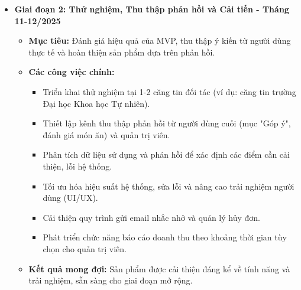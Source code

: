 \documentclass[12pt,a4paper]{article}
\begin{document}
\begin{itemize}[label=\textbullet]
    \item \textbf{Giai đoạn 2: Thử nghiệm, Thu thập phản hồi và Cải tiến - Tháng 11-12/2025}
    \begin{itemize}[label=\textendash]
        \item \textbf{Mục tiêu:} Đánh giá hiệu quả của MVP, thu thập ý kiến từ người dùng thực tế và hoàn thiện sản phẩm dựa trên phản hồi.
        \item \textbf{Các công việc chính:}
        \begin{itemize}[label=\textrightarrow]
            \item Triển khai thử nghiệm tại 1-2 căng tin đối tác (ví dụ: căng tin trường Đại học Khoa học Tự nhiên).
            \item Thiết lập kênh thu thập phản hồi từ người dùng cuối (mục "Góp ý", đánh giá món ăn) và quản trị viên.
            \item Phân tích dữ liệu sử dụng và phản hồi để xác định các điểm cần cải thiện, lỗi hệ thống.
            \item Tối ưu hóa hiệu suất hệ thống, sửa lỗi và nâng cao trải nghiệm người dùng (UI/UX).
            \item Cải thiện quy trình gửi email nhắc nhở và quản lý hủy đơn.
            \item Phát triển chức năng báo cáo doanh thu theo khoảng thời gian tùy chọn cho quản trị viên.
        \end{itemize}
        \item \textbf{Kết quả mong đợi:} Sản phẩm được cải thiện đáng kể về tính năng và trải nghiệm, sẵn sàng cho giai đoạn mở rộng.
    \end{itemize}


\end{itemize}
\end{document}
